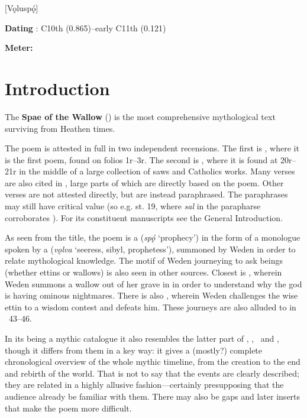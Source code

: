 [Vǫluspǫ́]

\begin{flushright}%
\textbf{Dating} \parencite{Sapp2022}: C10th (0.865)–early C11th (0.121)

\textbf{Meter:} \Fornyrdislag%
\end{flushright}

\section{Introduction}

The \textbf{Spae of the Wallow} (\Voluspa) is the most comprehensive mythological text surviving from Heathen times.

The poem is attested in full in two independent recensions. The first is \Regius, where it is the first poem, found on folios 1r–3r. The second is \Hauksbok, where it is found at 20r–21r in the middle of a large collection of saws and Catholics works. Many verses are also cited in \Gylfaginning, large parts of which are directly based on the poem. Other verses are not attested directly, but are instead paraphrased. The paraphrases may still have critical value (so e.g. st. 19, where \emph{sal} in the parapharse corroborates \Hauksbok). For its constituent manuscripts see the General Introduction. %

As seen from the title, the poem is a  (\emph{spǫ́} ‘prophecy’) in the form of a monologue spoken by a  (\emph{vǫlva} ‘seeress, sibyl, prophetess’), summoned by Weden in order to relate mythological knowledge. The motif of Weden journeying to ask beings (whether ettins or wallows) is also seen in other sources. Closest is \Baldrsdraumar, wherein Weden summons a wallow out of her grave in  in order to understand why the god  is having ominous nightmares. There is also \Vafthrudnismal, wherein Weden challenges the wise ettin  to a wisdom contest and defeats him. These journeys are also alluded to in \Harbardsljod\ 43–46.

In its being a mythic catalogue it also resembles the latter part of \Havamal, \Grimnismal, \Sigrdrifumal\ and \Allvismal, though it differs from them in a key way: it gives a (mostly?) complete chronological overview of the whole mythic timeline, from the creation to the end and rebirth of the world. That is not to say that the events are clearly described; they are related in a highly allusive fashion—certainly presupposing that the audience already be familiar with them. There may also be gaps and later inserts that make the poem more difficult.


